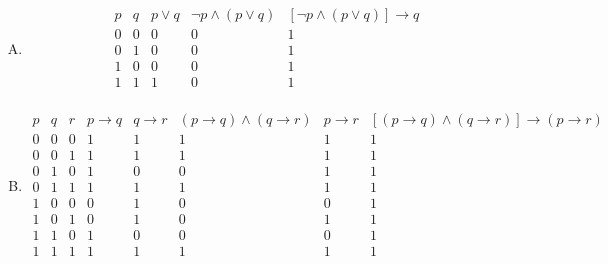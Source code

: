 {{        %
        \begin{practices}
            \begin{enumerate}[A.]
                \item
                {
                    \begin{table}[H]
                        \[
                            \begin{array}{c|c|c|c|c}
                                \hline
                                p & q & p \vee q & \neg p \wedge (p \vee q) & [\neg p \wedge (p \vee q)] \rightarrow q \\
                                \hline
                                0 & 0 & 0 & 0 & 1 \\
                                0 & 1 & 0 & 0 & 1 \\
                                1 & 0 & 0 & 0 & 1 \\
                                1 & 1 & 1 & 0 & 1 \\
                            \end{array}
                        \]
                    \end{table}
                }
                \item
                {
                    \begin{table}[H]
                        \[
                            \begin{array}{c|c|c|c|c|c|c|c}
                                \hline
                                p & q & r & p \rightarrow q & q \rightarrow r & (p \rightarrow q) \wedge (q \rightarrow r) & p \rightarrow r & [(p \rightarrow q) \wedge (q \rightarrow r)] \rightarrow (p \rightarrow r) \\
                                \hline
                                0 & 0 & 0 & 1 & 1 & 1 & 1 & 1 \\
                                0 & 0 & 1 & 1 & 1 & 1 & 1 & 1 \\
                                0 & 1 & 0 & 1 & 0 & 0 & 1 & 1 \\
                                0 & 1 & 1 & 1 & 1 & 1 & 1 & 1 \\
                                1 & 0 & 0 & 0 & 1 & 0 & 0 & 1 \\
                                1 & 0 & 1 & 0 & 1 & 0 & 1 & 1 \\
                                1 & 1 & 0 & 1 & 0 & 0 & 0 & 1 \\
                                1 & 1 & 1 & 1 & 1 & 1 & 1 & 1 \\

\end{array}\]
\end{table}}
\end{enumerate}
\end{practices}}}
